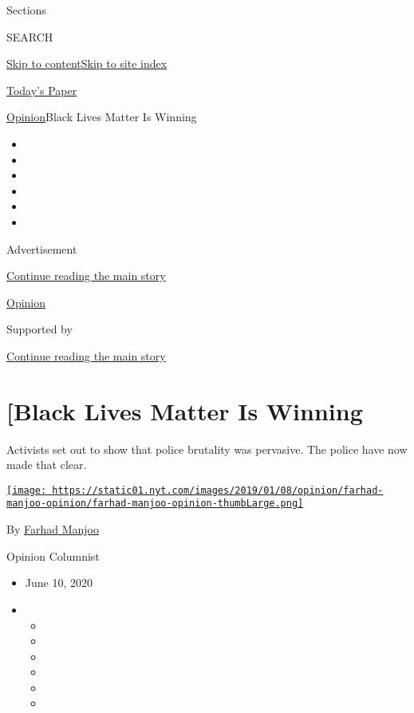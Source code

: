 Sections

SEARCH

\protect\hyperlink{site-content}{Skip to
content}\protect\hyperlink{site-index}{Skip to site index}

\href{https://myaccount.nytimes.com/auth/login?response_type=cookie\&client_id=vi}{}

\href{https://www.nytimes.com/section/todayspaper}{Today's Paper}

\href{/section/opinion}{Opinion}\textbar{}{[}Black Lives Matter Is
Winning

\begin{itemize}
\item
\item
\item
\item
\item
\item
\end{itemize}

Advertisement

\protect\hyperlink{after-top}{Continue reading the main story}

\href{/section/opinion}{Opinion}

Supported by

\protect\hyperlink{after-sponsor}{Continue reading the main story}

\hypertarget{black-lives-matter-is-winning}{%
\section{{[}Black Lives Matter Is
Winning}\label{black-lives-matter-is-winning}}

Activists set out to show that police brutality was pervasive. The
police have now made that clear.

\href{https://www.nytimes.com/by/farhad-manjoo}{\texttt{[image: https://static01.nyt.com/images/2019/01/08/opinion/farhad-manjoo-opinion/farhad-manjoo-opinion-thumbLarge.png]}}

By \href{https://www.nytimes.com/by/farhad-manjoo}{Farhad Manjoo}

Opinion Columnist

\begin{itemize}
\item
  June 10, 2020
\item
  \begin{itemize}
  \item
  \item
  \item
  \item
  \item
  \item
  \end{itemize}
\end{itemize}

